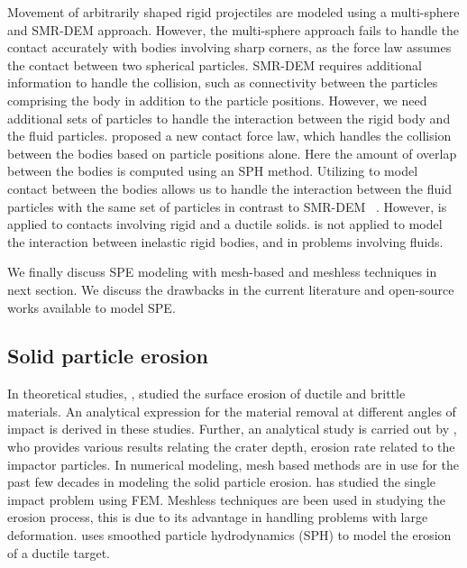 Movement of arbitrarily shaped rigid projectiles are modeled using a
multi-sphere and SMR-DEM approach. However, the multi-sphere approach fails to
handle the contact accurately with bodies involving sharp corners, as the force
law assumes the contact between two spherical particles. SMR-DEM requires
additional information to handle the collision, such as connectivity between the
particles comprising the body in addition to the particle positions. However, we
need additional sets of particles to handle the interaction between the rigid
body and the fluid particles. \cite{mohseni2021particle} proposed a new contact
force law, which handles the collision between the bodies based on particle
positions alone. Here the amount of overlap between the bodies is computed using
an SPH method. Utilizing \citep{mohseni2021particle} to model contact between
the bodies allows us to handle the interaction between the fluid particles with
the same set of particles in contrast to SMR-DEM ~\cite{zhan2021surface}.
However, \citep{mohseni2021particle} is applied to contacts involving rigid and
a ductile solids. \citep{mohseni2021particle} is not applied to model the
interaction between inelastic rigid bodies, and in problems involving fluids.

We finally discuss SPE modeling with mesh-based and meshless techniques in next
section. We discuss the drawbacks in the current literature and open-source
works available to model SPE.

\subsection{Solid particle erosion}
In theoretical studies, \cite{finnie1972some}, \cite{bitter1963study}
studied the surface erosion of ductile and brittle materials. An analytical
expression for the material removal at different angles of impact is derived in
these studies. Further, an analytical study is carried out by
\cite{hutchings1977erosion}, who provides various results relating the
crater depth, erosion rate related to the impactor particles. In numerical
modeling, mesh based methods are in use for the past few decades in modeling the
solid particle erosion. \cite{molinari2002study,takaffoli2009finite} has
studied the single impact problem using FEM. Meshless techniques are been used
in studying the erosion process, this is due to its advantage in handling
problems with large deformation. \cite{dong2016smoothed} uses smoothed
particle hydrodynamics (SPH) to model the erosion of a ductile target.

